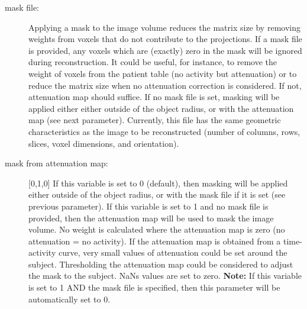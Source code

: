 \documentclass{article}
\begin{document}
{{\begin{description}




\item[mask file:] Applying a mask to the image volume reduces the matrix size by removing weights from voxels that do not contribute to the projections. If a mask file is provided, any voxels which are (exactly) zero in the mask will be ignored during reconstruction. It could be useful, for instance, to remove the weight of voxels from the patient table (no activity but attenuation) or to reduce the matrix size when no attenuation correction is considered. If not, attenuation map should suffice. If no mask file is set, masking will be applied either either outside of the object radius, or with the attenuation map (see next parameter).  Currently, this file has the same geometric characteristics as the image to be reconstructed (number of columns, rows, slices, voxel dimensions, and orientation).

\item[mask from attenuation map:]  [0,1,0{]} If this variable is set to 0 (default), then masking will be applied either outside of the object radius, or with the mask file if it is set (see previous parameter). If this variable is set to 1 and no mask file is provided, then the attenuation map will be used to mask the image volume. No weight is calculated where the attenuation map is zero (no attenuation = no activity). If the attenuation map is obtained from a time-activity curve, very small values of attenuation could be set around the subject. Thresholding the attenuation map could be considered to adjust the mask to the subject. NaNs values are set to zero. \textbf{Note:} If this variable is set to 1 AND the mask file is specified, then this parameter will be automatically set to 0.


\end{description}}}
\end{document}
